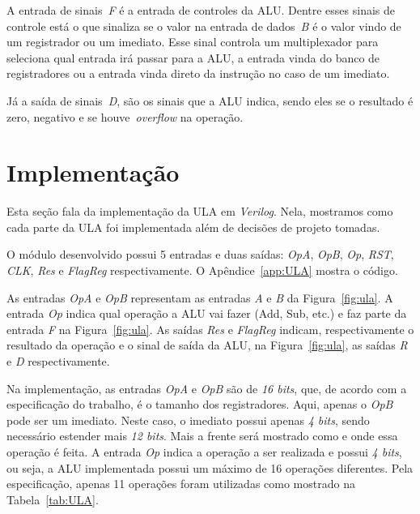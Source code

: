 \documentclass[11pt,a4paper,titlepage]{article}
\begin{document}
A entrada de sinais~\textit{F} é a entrada de controles da ALU.
Dentre esses sinais de controle está o que sinaliza se o valor na entrada de dados~\textit{B} é o valor vindo de um registrador ou um imediato.
Esse sinal controla um multiplexador para seleciona qual entrada irá passar para a ALU, a entrada vinda do banco de registradores ou a entrada vinda direto da instrução no caso de um imediato.

Já a saída de sinais~\textit{D}, são os sinais que a ALU indica, sendo eles se o resultado é zero, negativo e se houve~\textit{overflow} na operação.

\section{Implementação}

Esta seção fala da implementação da ULA em \textit{Verilog}.
Nela, mostramos como cada parte da ULA foi implementada além de decisões de projeto tomadas.

O módulo desenvolvido possui 5 entradas e duas saídas: \textit{OpA}, \textit{OpB}, \textit{Op}, \textit{RST}, \textit{CLK}, \textit{Res} e \textit{FlagReg} respectivamente.
O Apêndice~\ref{app:ULA} mostra o código.

As entradas \textit{OpA} e \textit{OpB} representam as entradas \textit{A} e \textit{B} da Figura~\ref{fig:ula}.
A entrada \textit{Op} indica qual operação a ALU vai fazer (Add, Sub, etc.) e faz parte da entrada \textit{F} na Figura~\ref{fig:ula}.
As saídas \textit{Res} e \textit{FlagReg} indicam, respectivamente o resultado da operação e o sinal de saída da ALU, na Figura~\ref{fig:ula}, as saídas \textit{R} e \textit{D} respectivamente.

Na implementação, as entradas \textit{OpA} e \textit{OpB} são de \textit{16 bits}, que, de acordo com a especificação do trabalho, é o tamanho dos registradores.
Aqui, apenas o \textit{OpB} pode ser um imediato.
Neste caso, o imediato possui apenas \textit{4 bits}, sendo necessário estender mais \textit{12 bits}.
Mais a frente será mostrado como e onde essa operação é feita.
A entrada \textit{Op} indica a operação a ser realizada e possui \textit{4 bits}, ou seja, a ALU implementada possui um máximo de 16 operações diferentes.
Pela especificação, apenas 11 operações foram utilizadas como mostrado na Tabela~\ref{tab:ULA}.
\end{document}
